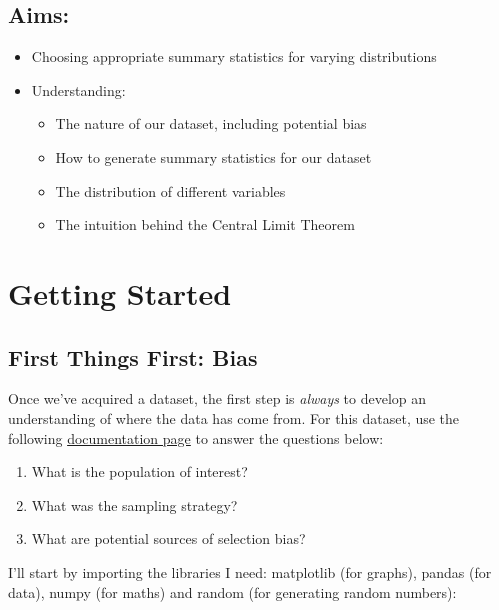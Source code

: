 \documentclass[
  letterpaper,
  DIV=11,
  numbers=noendperiod]{scrreprt}
\providecommand{\tightlist}{%
  \setlength{\itemsep}{0pt}\setlength{\parskip}{0pt}}\usepackage{longtable,booktabs,array}
\begin{document}
\hypertarget{aims-2}{%
\subsection{Aims:}\label{aims-2}}

\begin{itemize}
\item
  Choosing appropriate summary statistics for varying distributions
\item
  Understanding:

  \begin{itemize}
  \tightlist
  \item
    The nature of our dataset, including potential bias
  \item
    How to generate summary statistics for our dataset
  \item
    The distribution of different variables
  \item
    The intuition behind the Central Limit Theorem
  \end{itemize}
\end{itemize}

\hypertarget{getting-started-1}{%
\section{Getting Started}\label{getting-started-1}}

\hypertarget{first-things-first-bias}{%
\subsection{First Things First: Bias}\label{first-things-first-bias}}

Once we've acquired a dataset, the first step is \emph{always} to
develop an understanding of where the data has come from. For this
dataset, use the following
\href{https://www.census.gov/programs-surveys/cps/technical-documentation/methodology.html}{documentation
page} to answer the questions below:

\begin{enumerate}
\def\labelenumi{\arabic{enumi})}
\tightlist
\item
  What is the population of interest?
\item
  What was the sampling strategy?
\item
  What are potential sources of selection bias?
\end{enumerate}

I'll start by importing the libraries I need: matplotlib (for graphs),
pandas (for data), numpy (for maths) and random (for generating random
numbers):
\end{document}

